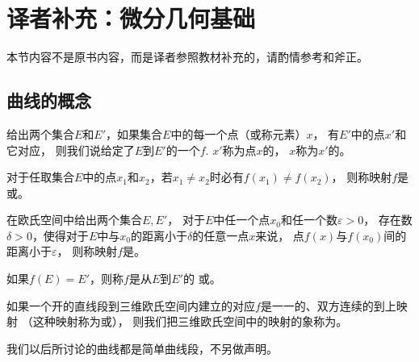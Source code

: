 \section{译者补充：微分几何基础}\label{sec:译者补充：微分几何基础}
\begin{remark}
    本节内容不是原书内容，而是译者参照教材补充的，请酌情参考和斧正。
\end{remark}

\subsection{曲线的概念}\label{sub:曲线的概念}
\begin{definition}
    给出两个集合$E$和$E'$，如果集合$E$中的每一个点（或称元素）$x$，
    有$E'$中的点$x'$和它对应，
    则我们说给定了$E$到$E'$的一个$f$.
    $x'$称为点$x$的，
    $x$称为$x'$的。
\end{definition}
\begin{definition}
    对于任取集合$E$中的点$x_1$和$x_2$，若$x_1\neq x_2$时必有$f(x_1)\neq f(x_2)$，
    则称映射$f$是或。
\end{definition}
\begin{definition}
    在欧氏空间中给出两个集合$E,E'$，
    对于$E$中任一个点$x_0$和任一个数$\varepsilon>0$，
    存在数$\delta>0$，使得对于$E$中与$x_0$的距离小于$\delta$的任意一点$x$来说，
    点$f(x)$与$f(x_0)$间的距离小于$\varepsilon$，
    则称映射$f$是。
\end{definition}
\begin{definition}
    如果$f(E)=E'$，则称$f$是从$E$到$E'$的
    或。
\end{definition}
\begin{definition}
    如果一个开的直线段到三维欧氏空间内建立的对应$f$是一一的、双方连续的到上映射
    （这种映射称为或），
    则我们把三维欧氏空间中的映射的象称为。
\end{definition}

我们以后所讨论的曲线都是简单曲线段，不另做声明。

